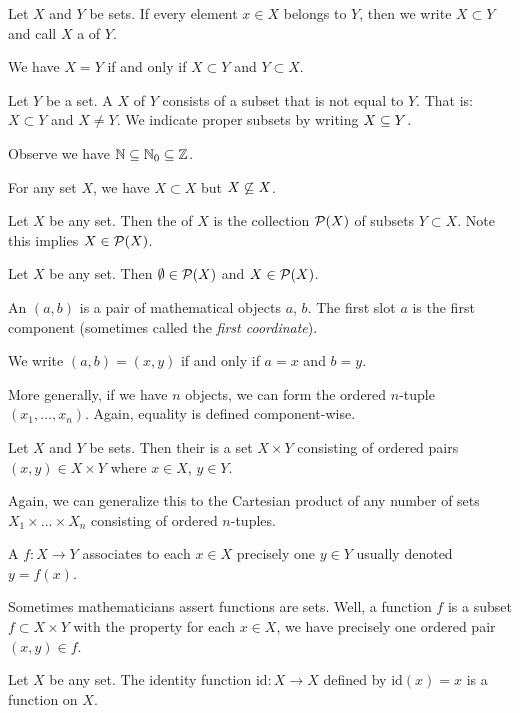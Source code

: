 Let $X$ and $Y$ be sets. If every element $x\in X$ belongs to $Y$, then
we write $X\subset Y$ and call $X$ a  of $Y$.

 We have $X=Y$ if and only if $X\subset Y$ and $Y\subset X$.

Let $Y$ be a set. A  $X$ of $Y$ consists of a
subset that is not equal to $Y$. That is: $X\subset Y$ and $X\neq Y$. We
indicate proper subsets by writing $X\propersubset Y$.

 Observe we have $\NN\propersubset\NN_{0}\propersubset\ZZ$.

 For any set $X$, we have $X\subset X$ but
$X\not\propersubset X$.

Let $X$ be any set. Then the  of $X$ is the collection
$\mathcal{P}(X)$ of subsets $Y\subset X$. Note this implies
$X\in\mathcal{P}(X)$. 

Let $X$ be any set. Then $\emptyset\in\mathcal{P}(X)$ and
$X\in\mathcal{P}(X)$.

An  $(a,b)$ is a pair of mathematical objects $a$,
$b$. The first slot $a$ is the first component (sometimes called
the \emph{first coordinate}).

We write $(a,b)=(x,y)$ if and only if $a=x$ and $b=y$.

More generally, if we have $n$ objects, we can form the ordered
$n$-tuple $(x_{1},\dots,x_{n})$. Again, equality is defined
component-wise. 

Let $X$ and $Y$ be sets. Then their  is a set
$X\times Y$ consisting of ordered pairs $(x,y)\in X\times Y$ where $x\in
X$, $y\in Y$.

Again, we can generalize this to the Cartesian product of any number of
sets $X_1\times\dots\times X_n$ consisting of ordered $n$-tuples.

A  $f\colon X\to Y$ associates to each $x\in X$
precisely one $y\in Y$ usually denoted $y=f(x)$. 

Sometimes mathematicians assert functions are sets. Well, a function $f$
is a subset $f\subset X\times Y$ with the property for each $x\in X$, we
have precisely one ordered pair $(x,y)\in f$.

Let $X$ be any set.
The identity function $\mathrm{id}\colon X\to X$ defined by
$\mathrm{id}(x)=x$ is a function on $X$.
